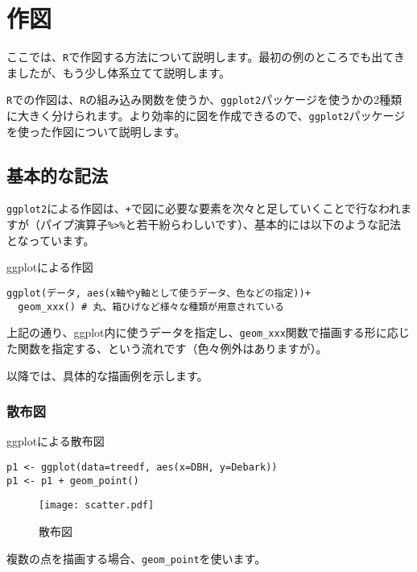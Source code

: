 
\section{作図}
\label{graph}
ここでは、\texttt{R}で作図する方法について説明します。最初の例のところでも出てきましたが、もう少し体系立てて説明します。

\texttt{R}での作図は、\texttt{R}の組み込み関数を使うか、\verb|ggplot2|パッケージを使うかの2種類に大きく分けられます。より効率的に図を作成できるので、\verb|ggplot2|パッケージを使った作図について説明します。

  \subsection{基本的な記法}
\verb|ggplot2|による作図は、\verb|+|で図に必要な要素を次々と足していくことで行なわれますが（パイプ演算子\verb|%>%|と若干紛らわしいです）、基本的には以下のような記法となっています。
\begin{itembox}[l]{ggplotによる作図}
\begin{verbatim}
ggplot(データ, aes(x軸やy軸として使うデータ、色などの指定))+
  geom_xxx() # 丸、箱ひげなど様々な種類が用意されている
\end{verbatim}
\end{itembox}
上記の通り、ggplot内に使うデータを指定し、\verb|geom_xxx|関数で描画する形に応じた関数を指定する、という流れです（色々例外はありますが）。

以降では、具体的な描画例を示します。

    \subsubsection{散布図}
\begin{itembox}[l]{ggplotによる散布図}
\begin{verbatim}
p1 <- ggplot(data=treedf, aes(x=DBH, y=Debark))
p1 <- p1 + geom_point()
\end{verbatim}
\end{itembox}
\begin{figure}[htb]
\begin{center}
\graphicspath{{1_basic/figs/}}
\texttt{[image: scatter.pdf]}\\
\caption{散布図}
 \label{scatter}
\end{center}
\end{figure}
複数の点を描画する場合、\verb|geom_point|を使います。

